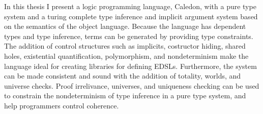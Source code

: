 In this thesis I present a logic programming language, Caledon, with a pure type system
and a turing complete type inference and implicit argument system based on the semantics of the
object language.  Because the language has dependent types and type inference, terms can be generated 
by providing type constraints.  The addition of control structures such as implicits, costructor hiding,
shared holes, existential quantification, polymorphism, and nondeterminism make the language ideal for 
creating libraries for defining EDSLs.  Furthermore, the system can be made consistent and sound with 
the addition of totality, worlds, and universe checks. Proof irrelivance, universes, and uniqueness 
checking can be used to constrain the nondeterminism of type inference in a pure type system, and help 
programmers control coherence.


